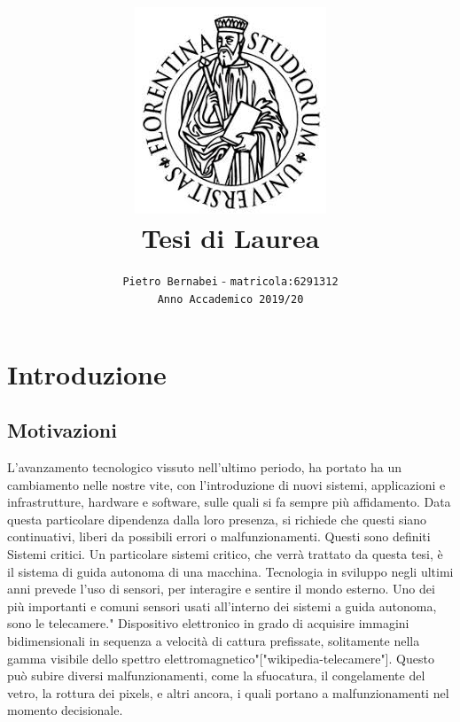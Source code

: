 \documentclass[14pt]{extarticle}
\begin{document}
\title{\includegraphics{download.jpeg} \vspace{2cm} \textbf{\\Tesi di Laurea}}

\author{\texttt{Pietro Bernabei} - \texttt{matricola:6291312}\\ \texttt{Anno Accademico 2019/20}}
\date{}
\maketitle

\newpage
\section{Introduzione}
\subsection{Motivazioni}
L'avanzamento tecnologico vissuto nell'ultimo periodo,  ha portato ha un cambiamento nelle nostre vite, con l'introduzione di nuovi sistemi, applicazioni e infrastrutture, hardware e software, sulle quali si fa sempre più affidamento.
Data questa particolare dipendenza dalla loro presenza, si richiede che questi siano continuativi, liberi da possibili errori o malfunzionamenti. Questi sono definiti Sistemi critici.
Un particolare sistemi critico, che verrà trattato da questa tesi, è il sistema di guida autonoma di una macchina.
Tecnologia in sviluppo negli ultimi anni prevede l'uso di sensori, per interagire e sentire il mondo esterno. Uno dei più importanti e comuni sensori usati all'interno dei sistemi a guida autonoma, sono le telecamere." Dispositivo elettronico in grado di acquisire immagini bidimensionali in sequenza a velocità di cattura prefissate, solitamente nella gamma visibile dello spettro elettromagnetico"["wikipedia-telecamere"]. Questo può subire diversi malfunzionamenti, come la sfuocatura, il congelamente del vetro, la rottura dei pixels, e altri ancora, i quali portano a malfunzionamenti nel momento decisionale.
\end{document}
